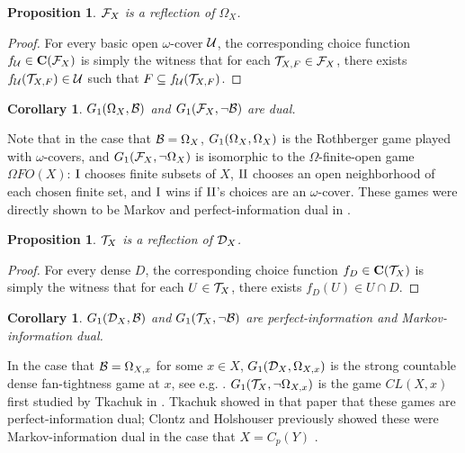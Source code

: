 \documentclass{amsart}
\theoremstyle{plain}
\newtheorem{corollary}[theorem]{Corollary}
\newtheorem{proposition}[theorem]{Proposition}
\theoremstyle{definition}
\theoremstyle{remark}
\theoremstyle{plain}
\theoremstyle{definition}
\theoremstyle{remark}
\begin{document}
\begin{proposition}
  \(\mathcal{F}_X\) is a reflection of \(\Omega_X\).
\end{proposition}
\begin{proof}
  For every basic open \(\omega\)-cover \(\mathcal{U}\), the corresponding choice function \(f_{\mathcal{U}}\in\mathbf C(\mathcal{F}_X)\) is simply
  the witness that for each \(\mathcal{T}_{X,F}\in\mathcal{F}_X\), there exists \(f_{\mathcal{U}}(\mathcal{T}_{X,F})\in\mathcal{U}\) such that
  \(F\subseteq f_{\mathcal{U}}(\mathcal{T}_{X,F})\).
\end{proof}

\begin{corollary}\label{coverSel2}
  \(G_{1}(\Omega_X,\mathcal{B})\) and \(G_{1}(\mathcal{F}_X,\neg\mathcal{B})\) are dual.
\end{corollary}

Note that in the case that \(\mathcal{B}=\Omega_X\), \(G_{1}(\Omega_X,\Omega_X)\) is the Rothberger
game played with \(\omega\)-covers, and \(G_{1}(\mathcal{F}_X,\neg\Omega_X)\) is isomorphic
to the \(\Omega\)-finite-open game \(\Omega FO(X)\): \(\mathrm{I}\) chooses finite subsets of \(X\), \(\mathrm{II}\) chooses an open neighborhood
of each chosen finite set, and \(\mathrm{I}\) wins if \(\mathrm{II}\)'s choices are an \(\omega\)-cover.
These games were directly shown to be Markov and perfect-information dual in \cite{CLONTZ2019106815}.

\begin{proposition}
  \(\mathcal{T}_X\) is a reflection of \(\mathcal{D}_X\).
\end{proposition}
\begin{proof}
  For every dense \(D\), the corresponding choice function \(f_D\in\mathbf C(\mathcal{T}_X)\) is simply
  the witness that for each \(U\in\mathcal{T}_X\), there exists \(f_D(U)\in U\cap D\).
\end{proof}

\begin{corollary}
  \(G_{1}(\mathcal{D}_X,\mathcal{B})\) and \(G_{1}(\mathcal{T}_X,\neg\mathcal{B})\) are perfect-information
  and Markov-information dual.
\end{corollary}

In the case that \(\mathcal{B}=\Omega_{X,x}\) for some \(x\in X\), \(G_{1}(\mathcal{D}_X,\Omega_{X,x})\) is
the strong countable dense fan-tightness game at \(x\), see e.g. \cite{MR2678950}. \(G_{1}(\mathcal{T}_X,\neg\Omega_{X,x})\)
is the game \(CL(X,x)\) first studied by Tkachuk in \cite{tkachukTwoPointGame}. Tkachuk showed in that paper
that these games are perfect-information dual; Clontz and Holshouser previously showed these were Markov-information
dual in the case that \(X=C_p(Y)\)  \cite{CLONTZ2019106815}.
\end{document}
